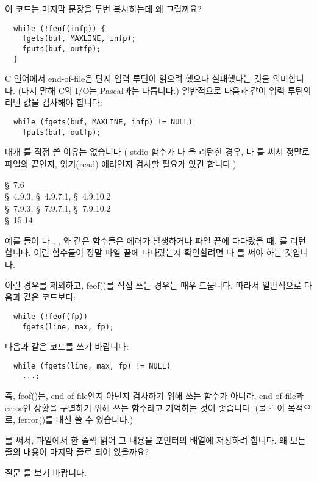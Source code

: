 \begin{faq}
	이 코드는 마지막 문장을 두번 복사하는데 왜 그럴까요?
\begin{verbatim}
  while (!feof(infp)) {
    fgets(buf, MAXLINE, infp);
    fputs(buf, outfp);
  }
\end{verbatim}
\A
	C 언어에서 end-of-file은 단지 입력 루틴이 읽으려 했으나 실패했다는
	것을 의미합니다.  (다시 말해 C의 I/O는 Pascal과는 다릅니다.)
	일반적으로 다음과 같이 입력 루틴의 리턴 값을 검사해야 합니다:

\begin{verbatim}
  while (fgets(buf, MAXLINE, infp) != NULL)
    fputs(buf, outfp);
\end{verbatim}

	대개 를 직접 쓸 이유는 없습니다  (
	stdio 함수가 나 을 리턴한 경우, 나
	를 써서 정말로 파일의 끝인지, 읽기(read) 에러인지
	검사할 필요가 있긴 합니다.)

\R
	\cite{kr2} \S\ 7.6  \\
        \cite{ansi} \S\ 4.9.3, \S\ 4.9.7.1, \S\ 4.9.10.2 \\
	\cite{c89} \S\ 7.9.3, \S\ 7.9.7.1, \S\ 7.9.10.2 \\
	\cite{hs} \S\ 15.14 

\T
	예를 들어 나 , , 와
	같은 함수들은 에러가 발생하거나 파일 끝에 다다랐을 때, 를
	리턴합니다.  이런 함수들이 정말 파일 끝에 다다랐는지 확인할려면
	나 를 써야 하는 것입니다.

        이런 경우를 제외하고, feof()를 직접 쓰는 경우는 매우 드뭅니다. 따라서
        일반적으로 다음과 같은 코드보다:
\begin{verbatim}
  while (!feof(fp))
    fgets(line, max, fp);
\end{verbatim}

        다음과 같은 코드를 쓰기 바랍니다:
\begin{verbatim}
  while (fgets(line, max, fp) != NULL)
    ...;
\end{verbatim}

	즉, feof()는, end-of-file인지 아닌지 검사하기 위해 쓰는 함수가 아니라,
        end-of-file과 error인 상황을 구별하기 위해 쓰는 함수라고 기억하는 것이
        좋습니다. (물론 이 목적으로, ferror()를 대신 쓸 수 있습니다.)
\end{faq}

\begin{faq}
	를 써서, 파일에서 한 줄씩 읽어 그 내용을 포인터의 배열에 
        저장하려 합니다. 왜 모든 줄의 내용이 마지막 줄로 되어 있을까요?

\A
	질문 를 보기 바랍니다.
\end{faq}

